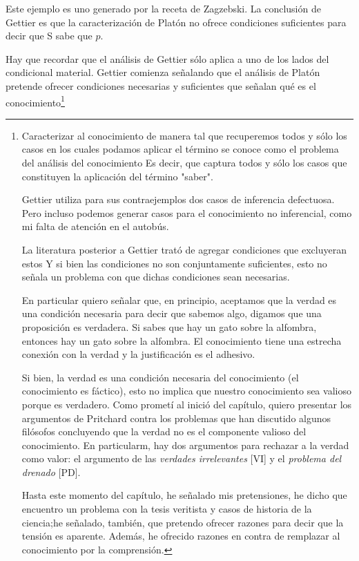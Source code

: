 {{Este ejemplo es uno generado por la receta de Zagzebski.
La conclusión de Gettier es que la caracterización de Platón no ofrece condiciones suficientes para decir que S sabe que $p$.

Hay que recordar que el análisis de Gettier sólo aplica a uno de los lados del condicional material.
Gettier comienza señalando que el análisis de Platón pretende ofrecer condiciones necesarias y suficientes que señalan qué es el conocimiento\footnote{Caracterizar al conocimiento de manera tal que recuperemos todos y sólo los casos en los cuales podamos aplicar el término se conoce como el problema del análisis del conocimiento %
Es decir, que captura todos y sólo los casos que constituyen la aplicación del término "saber".

Gettier utiliza para sus contraejemplos dos casos de inferencia defectuosa.
Pero incluso podemos generar casos para el conocimiento no inferencial, como mi falta de atención en el autobús.

La literatura posterior a Gettier trató de agregar condiciones que excluyeran  estos %
Y si bien las condiciones no son conjuntamente suficientes, esto no señala un problema con que dichas condiciones sean necesarias.

En particular quiero señalar que, en principio, aceptamos que la verdad es una condición necesaria para decir que sabemos algo, digamos que una proposición es verdadera.
Si sabes que hay un gato sobre la alfombra, entonces hay un gato sobre la alfombra.
El conocimiento tiene una estrecha conexión con la verdad y la justificación es el adhesivo.

Si bien, la verdad es una condición necesaria del conocimiento (el conocimiento es fáctico), esto no implica que nuestro conocimiento sea valioso porque es verdadero.
Como prometí al inició del capítulo, quiero presentar los argumentos de Pritchard contra los problemas que han discutido algunos filósofos concluyendo que la verdad no es el componente valioso del conocimiento.
En particularm, hay dos argumentos para rechazar a la verdad como valor: el argumento de las \emph{verdades irrelevantes} [VI] y el \emph{problema del drenado} [PD].

Hasta este momento del capítulo, he señalado mis pretensiones, he dicho que encuentro un problema con la tesis veritista y casos de historia de la ciencia;he señalado, también, que pretendo ofrecer razones para decir que la tensión es aparente.
Además, he ofrecido razones en contra de remplazar al conocimiento por la comprensión.

}}}
